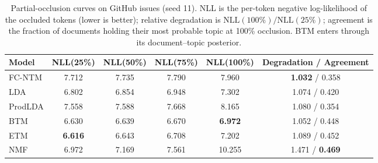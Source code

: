 \documentclass[11pt]{article}
\newcommand{\fcntm}{FC-NTM}
\begin{document}
\begin{table}[t]
\centering
\caption{Partial-occlusion curves on GitHub issues (seed 11). NLL is the per-token negative log-likelihood of the occluded tokens (lower is better); relative degradation is $\mathrm{NLL}(100\%)/\mathrm{NLL}(25\%)$; agreement is the fraction of documents holding their most probable topic at 100\% occlusion. BTM enters through its document--topic posterior.}
\label{tab:occl-robust}
\footnotesize
\setlength{\tabcolsep}{3pt}
\begin{tabular}{@{}lccccc@{}}
\toprule
Model & NLL(25\%) & NLL(50\%) & NLL(75\%) & NLL(100\%) & Degradation / Agreement \\
\midrule
\fcntm{} & 7.712 & 7.735 & 7.790 & 7.960 & \textbf{1.032} / 0.358 \\
LDA & 6.802 & 6.854 & 6.948 & 7.302 & 1.074 / 0.420 \\
ProdLDA & 7.558 & 7.588 & 7.668 & 8.165 & 1.080 / 0.354 \\
BTM & 6.630 & 6.639 & 6.670 & \textbf{6.972} & 1.052 / 0.448 \\
ETM & \textbf{6.616} & 6.643 & 6.708 & 7.202 & 1.089 / 0.452 \\
NMF & 6.972 & 7.169 & 7.561 & 10.255 & 1.471 / \textbf{0.469} \\
\bottomrule
\end{tabular}
\end{table}
\end{document}

